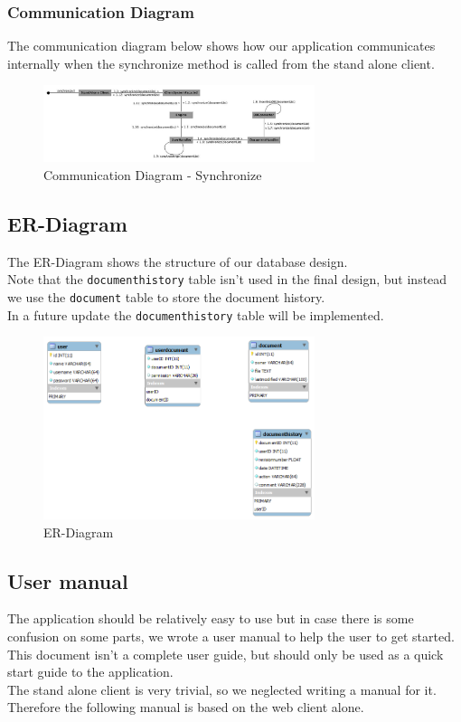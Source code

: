 \documentclass[11pt]{article}
\begin{document}
\subsubsection{Communication Diagram}
\label{sec-3-2-2}
The communication diagram below shows how our application communicates internally when the synchronize method is called from the stand alone client. 
\begin{figure}[H]
  		\centering
    	\includegraphics[width=300px]{images/CommunicationDiagram_Synchronize.jpg}
    	\caption{Communication Diagram - Synchronize}
\end{figure}

\subsection{ER-Diagram}
\label{sec-3-3}
The ER-Diagram shows the structure of our database design. \\
Note that the \texttt{documenthistory} table isn't used in the final design, but instead we use the \texttt{document} table to store the document history. \\
In a future update the \texttt{documenthistory} table will be implemented.
\begin{figure}[H]
  		\centering
    	\includegraphics[width=300px]{images/New ER database.png}
    	\caption{ER-Diagram}
\end{figure}
\subsection{User manual}
\label{sec-3-4}
The application should be relatively easy to use but in case there is some confusion on some parts, we wrote a user manual to help the user to get started. \\
This document isn't a complete user guide, but should only be used as a quick start guide to the application. \\
The stand alone client is very trivial, so we neglected writing a manual for it. Therefore the following manual is based on the web client alone.
\end{document}

